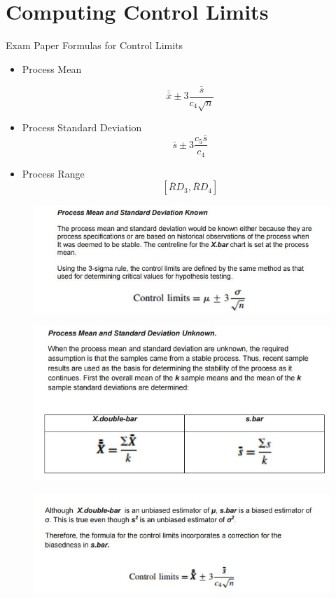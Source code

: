 \documentclass[]{report}
\begin{document}
{\section{Computing Control Limits}
\begin{framed}
Exam Paper Formulas for Control Limits
	\begin{itemize}
\item Process Mean


	
	\[ \bar{\bar{x}} \pm 3\frac{\bar{s}}{c_4\sqrt{n}}\]
\item Process Standard Deviation	
	\[ \bar{s} \pm 3\frac{c_5\bar{s}}{c_4}\]
\item Process Range	
	\[\left[ \bar{R}D_3, \bar{R}D_4\right]\]
	\end{itemize}	
	\end{framed}
\begin{figure}[h!]
\centering
\includegraphics[width=1.0\linewidth]{images/computingControlLimits1a}

\end{figure}
\newpage
\begin{figure}[h!]
	\centering
	\includegraphics[width=1.0\linewidth]{images/computingControlLimits1b}
	
\end{figure}
\begin{figure}[h!]
	\centering
	\includegraphics[width=1.0\linewidth]{images/computingControlLimits2}


\end{figure}}
\end{document}
